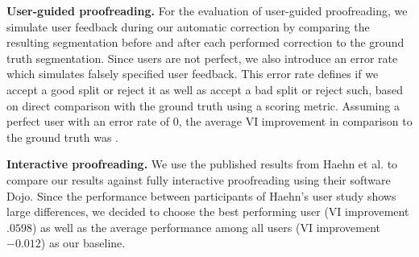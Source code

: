 \textbf{User-guided proofreading.} For the evaluation of user-guided proofreading, we simulate user feedback during our automatic correction by comparing the resulting segmentation before and after each performed correction to the ground truth segmentation. Since users are not perfect, we also introduce an error rate which simulates falsely specified user feedback. This error rate defines if we accept a good split or reject it as well as accept a bad split or reject such, based on direct comparison with the ground truth using a scoring metric. Assuming a perfect user with an error rate of 0, the average VI improvement in comparison to the ground truth was .

\textbf{Interactive proofreading.} We use the published results from Haehn et al. to compare our results against fully interactive proofreading using their software Dojo. Since the performance between participants of Haehn's user study shows large differences, we decided to choose the best performing user (VI improvement $.0598$) as well as the average performance among all users (VI improvement $-0.012$) as our baseline.

